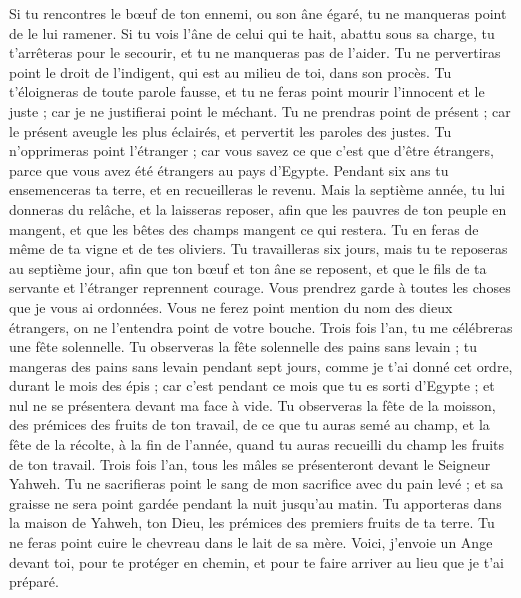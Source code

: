 \begin{multicols}{2}
Si tu rencontres le bœuf de ton ennemi, ou son âne égaré, tu ne manqueras point de le lui ramener.
Si tu vois l'âne de celui qui te hait, abattu sous sa charge, tu t'arrêteras pour le secourir, et tu ne manqueras pas de l'aider.
Tu ne pervertiras point le droit de l'indigent, qui est au milieu de toi, dans son procès.
Tu t'éloigneras de toute parole fausse, et tu ne feras point mourir l'innocent et le juste ; car je ne justifierai point le méchant.
Tu ne prendras point de présent ; car le présent aveugle les plus éclairés, et pervertit les paroles des justes.
Tu n'opprimeras point l'étranger ; car vous savez ce que c'est que d'être étrangers, parce que vous avez été étrangers au pays d'Egypte.
Pendant six ans tu ensemenceras ta terre, et en recueilleras le revenu.
Mais la septième année, tu lui donneras du relâche, et la laisseras reposer, afin que les pauvres de ton peuple en mangent, et que les bêtes des champs mangent ce qui restera. Tu en feras de même de ta vigne et de tes oliviers.
Tu travailleras six jours, mais tu te reposeras au septième jour, afin que ton bœuf et ton âne se reposent, et que le fils de ta servante et l'étranger reprennent courage.
Vous prendrez garde à toutes les choses que je vous ai ordonnées. Vous ne ferez point mention du nom des dieux étrangers, on ne l'entendra point de votre bouche.
Trois fois l'an, tu me célébreras une fête solennelle.
Tu observeras la fête solennelle des pains sans levain ; tu mangeras des pains sans levain pendant sept jours, comme je t'ai donné cet ordre, durant le mois des épis ; car c’est pendant ce mois que tu es sorti d'Egypte ; et nul ne se présentera devant ma face à vide.
Tu observeras la fête de la moisson, des prémices des fruits de ton travail, de ce que tu auras semé au champ, et la fête de la récolte, à la fin de l'année, quand tu auras recueilli du champ les fruits de ton travail.
Trois fois l'an, tous les mâles se présenteront devant le Seigneur Yahweh.
Tu ne sacrifieras point le sang de mon sacrifice avec du pain levé ; et sa graisse ne sera point gardée pendant la nuit jusqu’au matin.
Tu apporteras dans la maison de Yahweh, ton Dieu, les prémices des premiers fruits de ta terre. Tu ne feras point cuire le chevreau dans le lait de sa mère.
Voici, j'envoie un Ange devant toi, pour te protéger en chemin, et pour te faire arriver au lieu que je t'ai préparé.

\end{multicols}
